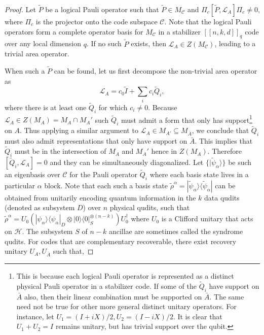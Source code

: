 \documentclass[%
 reprint,
superscriptaddress,
nofootinbib,
 amsmath,amssymb,
 aps,
prx,
floatfix,
]{revtex4-2}
\theoremstyle{definition}
\numberwithin{equation}{section}
\begin{document}
\begin{proof}
Let $\tilde{P}$ be a logical Pauli operator such that $\tilde{P}\in M_{\mathcal{C}}$ and $\Pi_c[\tilde{P},\mathcal{L}_{A}]\Pi_c\ne 0$, where $\Pi_c$ is the projector onto the code subspace $\mathcal{C}$. Note that the logical Pauli operators form a complete operator basis for $M_{\mathcal{C}}$ in a stabilizer $[[n,k,d]]_q$ code over any local dimension $q$. If no such $\tilde{P}$ exists, then $\mathcal{L}_A\in Z(M_{\mathcal{C}})$, leading to a trivial area operator. 


When such a $\tilde{P}$ can be found, let us first decompose the non-trivial area operator as
 \begin{equation}
     \mathcal{L}_A = c_0 \tilde{I}+\sum_i c_i \tilde{Q}_i,
 \end{equation}
 where there is at least one $\tilde{Q}_i$ for which $c_i\ne 0$. 
 Because $\mathcal{L}_A\in Z(M_A)=M_A\cap M_A'$ such $\tilde{Q}_i$ must admit a form that only has support\footnote{This is because each logical Pauli operator is represented as a distinct physical Pauli operator in a stabilizer code. If some of the $\tilde{Q}_i$ have support on $\bar{A}$ also, then their linear combination must be supported on $\bar{A}$. The same need not be true for other more general distinct unitary operators. For instance, let $U_1=(I+iX)/2, U_2=(I-iX)/2$. It is clear that $U_1+U_2=I$ remains unitary, but has trivial support over the qubit.} on $A$.  Thus applying a similar argument to $\mathcal{L}_A\in M_{A'}\subseteq M_{\bar{A}}$, we conclude that $\tilde{Q}_i$ must also admit representations that only have support on $\bar{A}$. This implies that $\tilde{Q}_i$ must be in the intersection of $M_A$ and $M_A'$ hence in $Z(M_A)$. Therefore $[\tilde{Q}_i,\mathcal{L}_A]=0$ and they can be simultaneously diagonalized. Let $\{|\tilde{\psi}_{\alpha}\rangle\}$ be such an eigenbasis over $\mathcal{C}$ for the Pauli operator $\tilde{Q}_i$ where each basis state lives in a particular $\alpha$ block. Note that each such a basis state $\tilde{\rho}^{\alpha}=|\tilde{\psi}_{\alpha}\rangle\langle\tilde{\psi}_{\alpha}|$ can be obtained from unitarily encoding quantum information in the $k$ data qudits (denoted as subsystem $D$) over $n$ physical qudits, such that $\tilde{\rho}^{\alpha}= U_0 (|\psi_{\alpha}\rangle\langle\psi_{\alpha}|_D\otimes |0\rangle\langle 0|_S^{\otimes(n-k)}) U^{\dagger}_0$ where $U_0$ is a Clifford unitary that acts on $\mathcal{H}$. The subsystem $S$ of $n-k$ ancillae are sometimes called the syndrome qudits. For codes that are complementary recoverable, there exist recovery unitary $U_A, U_{\bar{A}}$ such that, 


\end{proof}
\end{document}

